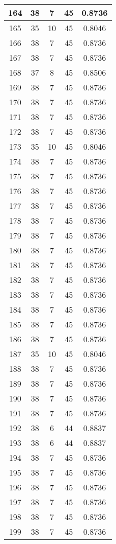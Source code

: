 \documentclass[letterpaper, 12pt]{article}
\begin{document}
\begin{longtable}{|c|c|c|c|c|}
\hline
164 & 38 & 7 & 45 & 0.8736 \\
\hline
165 & 35 & 10 & 45 & 0.8046 \\
\hline
166 & 38 & 7 & 45 & 0.8736 \\
\hline
167 & 38 & 7 & 45 & 0.8736 \\
\hline
168 & 37 & 8 & 45 & 0.8506 \\
\hline
169 & 38 & 7 & 45 & 0.8736 \\
\hline
170 & 38 & 7 & 45 & 0.8736 \\
\hline
171 & 38 & 7 & 45 & 0.8736 \\
\hline
172 & 38 & 7 & 45 & 0.8736 \\
\hline
173 & 35 & 10 & 45 & 0.8046 \\
\hline
174 & 38 & 7 & 45 & 0.8736 \\
\hline
175 & 38 & 7 & 45 & 0.8736 \\
\hline
176 & 38 & 7 & 45 & 0.8736 \\
\hline
177 & 38 & 7 & 45 & 0.8736 \\
\hline
178 & 38 & 7 & 45 & 0.8736 \\
\hline
179 & 38 & 7 & 45 & 0.8736 \\
\hline
180 & 38 & 7 & 45 & 0.8736 \\
\hline
181 & 38 & 7 & 45 & 0.8736 \\
\hline
182 & 38 & 7 & 45 & 0.8736 \\
\hline
183 & 38 & 7 & 45 & 0.8736 \\
\hline
184 & 38 & 7 & 45 & 0.8736 \\
\hline
185 & 38 & 7 & 45 & 0.8736 \\
\hline
186 & 38 & 7 & 45 & 0.8736 \\
\hline
187 & 35 & 10 & 45 & 0.8046 \\
\hline
188 & 38 & 7 & 45 & 0.8736 \\
\hline
189 & 38 & 7 & 45 & 0.8736 \\
\hline
190 & 38 & 7 & 45 & 0.8736 \\
\hline
191 & 38 & 7 & 45 & 0.8736 \\
\hline
192 & 38 & 6 & 44 & 0.8837 \\
\hline
193 & 38 & 6 & 44 & 0.8837 \\
\hline
194 & 38 & 7 & 45 & 0.8736 \\
\hline
195 & 38 & 7 & 45 & 0.8736 \\
\hline
196 & 38 & 7 & 45 & 0.8736 \\
\hline
197 & 38 & 7 & 45 & 0.8736 \\
\hline
198 & 38 & 7 & 45 & 0.8736 \\
\hline
199 & 38 & 7 & 45 & 0.8736 \\
\hline
\end{longtable}
\end{document}

